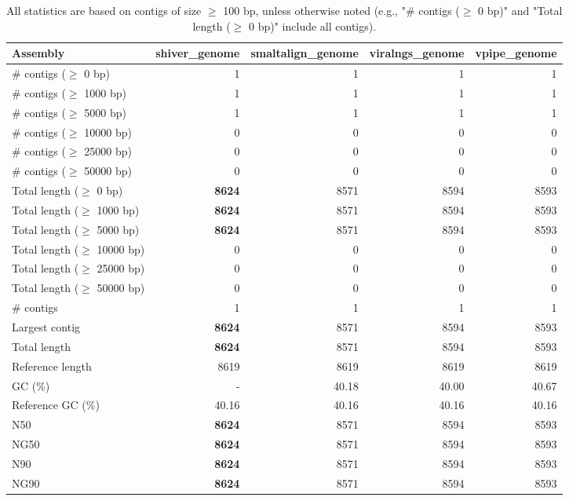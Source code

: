 \documentclass[12pt,a4paper]{article}
\begin{document}
\begin{table}[ht]
\begin{center}
\caption{All statistics are based on contigs of size $\geq$ 100 bp, unless otherwise noted (e.g., "\# contigs ($\geq$ 0 bp)" and "Total length ($\geq$ 0 bp)" include all contigs).}
\begin{tabular}{|l*{4}{|r}|}
\hline
Assembly & shiver\_genome & smaltalign\_genome & viralngs\_genome & vpipe\_genome \\ \hline
\# contigs ($\geq$ 0 bp) & 1 & 1 & 1 & 1 \\ \hline
\# contigs ($\geq$ 1000 bp) & 1 & 1 & 1 & 1 \\ \hline
\# contigs ($\geq$ 5000 bp) & 1 & 1 & 1 & 1 \\ \hline
\# contigs ($\geq$ 10000 bp) & 0 & 0 & 0 & 0 \\ \hline
\# contigs ($\geq$ 25000 bp) & 0 & 0 & 0 & 0 \\ \hline
\# contigs ($\geq$ 50000 bp) & 0 & 0 & 0 & 0 \\ \hline
Total length ($\geq$ 0 bp) & {\bf 8624} & 8571 & 8594 & 8593 \\ \hline
Total length ($\geq$ 1000 bp) & {\bf 8624} & 8571 & 8594 & 8593 \\ \hline
Total length ($\geq$ 5000 bp) & {\bf 8624} & 8571 & 8594 & 8593 \\ \hline
Total length ($\geq$ 10000 bp) & 0 & 0 & 0 & 0 \\ \hline
Total length ($\geq$ 25000 bp) & 0 & 0 & 0 & 0 \\ \hline
Total length ($\geq$ 50000 bp) & 0 & 0 & 0 & 0 \\ \hline
\# contigs & 1 & 1 & 1 & 1 \\ \hline
Largest contig & {\bf 8624} & 8571 & 8594 & 8593 \\ \hline
Total length & {\bf 8624} & 8571 & 8594 & 8593 \\ \hline
Reference length & 8619 & 8619 & 8619 & 8619 \\ \hline
GC (\%) & - & 40.18 & 40.00 & 40.67 \\ \hline
Reference GC (\%) & 40.16 & 40.16 & 40.16 & 40.16 \\ \hline
N50 & {\bf 8624} & 8571 & 8594 & 8593 \\ \hline
NG50 & {\bf 8624} & 8571 & 8594 & 8593 \\ \hline
N90 & {\bf 8624} & 8571 & 8594 & 8593 \\ \hline
NG90 & {\bf 8624} & 8571 & 8594 & 8593 \\ \hline

\end{tabular}
\end{center}
\end{table}
\end{document}

